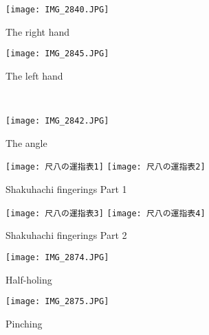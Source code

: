 
\begin{figure}[H]
	\centering
	\begin{minipage}{0.4\textwidth}
	\centering
	\texttt{[image: IMG\_2840.JPG]}
	\caption{The right hand}
	\label{fig:right_hand_position}
	\end{minipage}
	\hfill
	\begin{minipage}{0.4\textwidth}
	\centering
	\vspace{1cm}
	\texttt{[image: IMG\_2845.JPG]}
	\caption{The left hand}
	\label{fig:left_hand_position}
	\end{minipage}
	\\
	\centering
	\begin{minipage}{0.4\textwidth}
	\centering
	\texttt{[image: IMG\_2842.JPG]}
	\caption{The angle}
	\label{fig:angle}
	\end{minipage}
	\hfill*

\end{figure}

\begin{figure}[H]
	\centering
	\texttt{[image: 尺八の運指表1]}
	\vspace{1cm}
	\texttt{[image: 尺八の運指表2]}
	\caption{Shakuhachi fingerings Part 1}
	\label{fig:shakuhachi_fingerings_1}
\end{figure}

\begin{figure}[H]
	\centering
	\texttt{[image: 尺八の運指表3]}
	\vspace{1cm}
	\texttt{[image: 尺八の運指表4]}
	\caption{Shakuhachi fingerings Part 2}
	\label{fig:shakuhachi_fingerings_2}
\end{figure}

\vfill

\begin{figure}
	\centering
	\begin{minipage}{0.4\textwidth}
	\centering
	\texttt{[image: IMG\_2874.JPG]}
	\caption{Half-holing} \label{fig:half-holing}
	\end{minipage}
	\hfill
	\begin{minipage}{0.4\textwidth}
	\texttt{[image: IMG\_2875.JPG]}
	\caption{Pinching} \label{fig:pinching}
	\end{minipage}
\end{figure}
